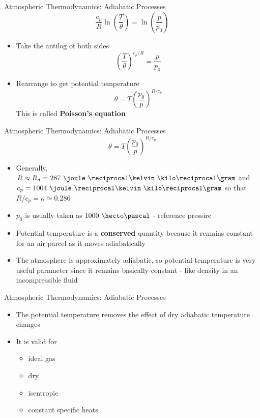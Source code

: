 \begin{frame}{Atmospheric Thermodynamics: Adiabatic Processes}
$$\frac{c_p}{R}\ln{\left(\frac{T}{\theta}\right)} = \ln{\left(\frac{p}{p_0}\right)}$$
\begin{itemize}
\item Take the antilog of both sides
$$\left(\frac{T}{\theta}\right)^{c_p/R} = \frac{p}{p_0}$$
\item Rearrange to get potential temperature
$$\theta = T\left(\frac{p_0}{p}\right)^{R/c_p}$$
This is called \textbf{Poisson's equation}
\end{itemize}
\end{frame}

\begin{frame}{Atmospheric Thermodynamics: Adiabatic Processes}
$$\theta = T\left(\frac{p_0}{p}\right)^{R/c_p}$$
\begin{itemize}
\item Generally, $R \approx R_d=287\ \joule\ \reciprocal\kelvin\ \kilo\reciprocal\gram$ and $c_p = 1004\ \joule\ \reciprocal\kelvin\ \kilo\reciprocal\gram$ so that $R/c_p = \kappa \simeq0.286$
\item $p_0$ is usually taken as $1000\ \hecto\pascal$ - reference pressire
\item Potential temperature is a \textbf{conserved} quantity because it remains constant for an air parcel as it moves adiabatically
\item The atmosphere is approximately adiabatic, so potential temperature is very useful parameter since it remains basically constant - like density in an incompressible fluid
\end{itemize}
\end{frame}

\begin{frame}{Atmospheric Thermodynamics: Adiabatic Processes}
\begin{itemize}
\item The potential temperature removes the effect of dry adiabatic temperature changes
\item It is valid for
\begin{itemize}
\item ideal gas
\item dry
\item isentropic
\item constant specific heats
\end{itemize}
\end{itemize}
\end{frame}

